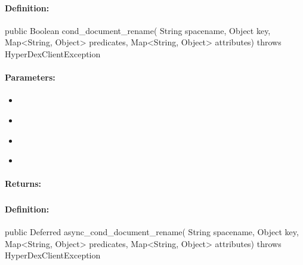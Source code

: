\paragraph{Definition:}
\begin{javacode}
public Boolean cond_document_rename(
        String spacename,
        Object key,
        Map<String, Object> predicates,
        Map<String, Object> attributes) throws HyperDexClientException
\end{javacode}

\paragraph{Parameters:}
\begin{itemize}[noitemsep]
\item {}\\

\item {}\\

\item {}\\

\item {}\\

\end{itemize}

\paragraph{Returns:}


\pagebreak
\subsubsection{}
\label{api:java:async_cond_document_rename}


\paragraph{Definition:}
\begin{javacode}
public Deferred async_cond_document_rename(
        String spacename,
        Object key,
        Map<String, Object> predicates,
        Map<String, Object> attributes) throws HyperDexClientException
\end{javacode}

